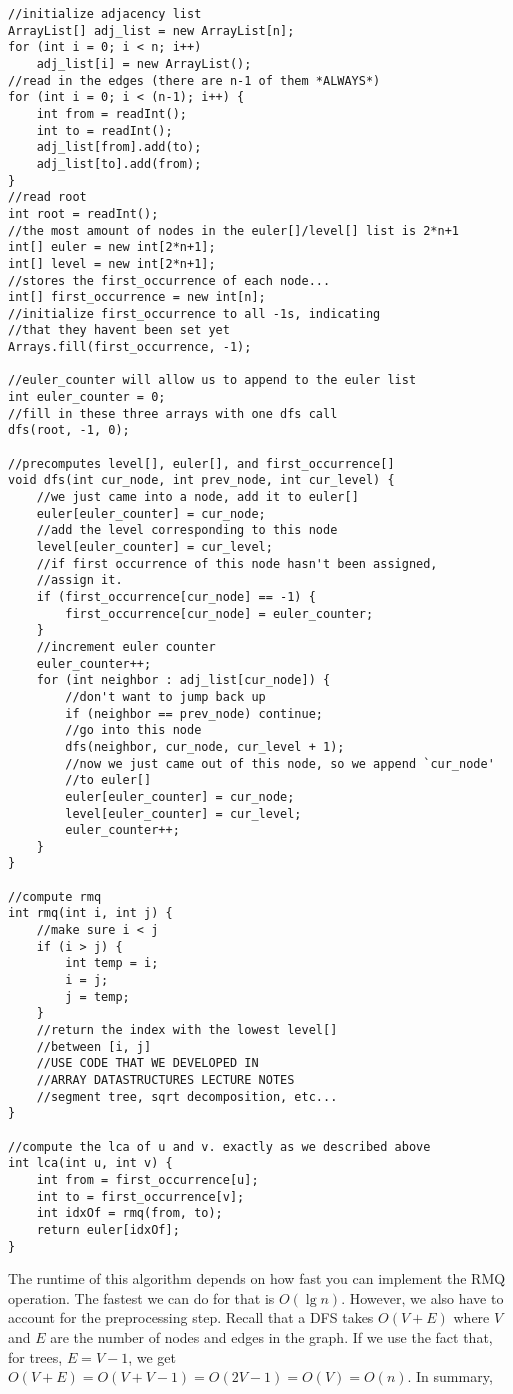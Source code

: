 \documentclass[11pt]{article}
\theoremstyle{plain}
\theoremstyle{definition}
\begin{document}
\begin{lstlisting}
//initialize adjacency list
ArrayList[] adj_list = new ArrayList[n];
for (int i = 0; i < n; i++)
	adj_list[i] = new ArrayList();
//read in the edges (there are n-1 of them *ALWAYS*)
for (int i = 0; i < (n-1); i++) {
	int from = readInt();
	int to = readInt();
	adj_list[from].add(to);
	adj_list[to].add(from);
}
//read root
int root = readInt();
//the most amount of nodes in the euler[]/level[] list is 2*n+1
int[] euler = new int[2*n+1];
int[] level = new int[2*n+1];
//stores the first_occurrence of each node...
int[] first_occurrence = new int[n];
//initialize first_occurrence to all -1s, indicating
//that they havent been set yet
Arrays.fill(first_occurrence, -1);

//euler_counter will allow us to append to the euler list
int euler_counter = 0;
//fill in these three arrays with one dfs call
dfs(root, -1, 0);

//precomputes level[], euler[], and first_occurrence[]
void dfs(int cur_node, int prev_node, int cur_level) {
	//we just came into a node, add it to euler[]
	euler[euler_counter] = cur_node;
	//add the level corresponding to this node
	level[euler_counter] = cur_level;
	//if first occurrence of this node hasn't been assigned,
	//assign it.
	if (first_occurrence[cur_node] == -1) {
		first_occurrence[cur_node] = euler_counter;
	}
	//increment euler counter
	euler_counter++;
	for (int neighbor : adj_list[cur_node]) {
		//don't want to jump back up
		if (neighbor == prev_node) continue;
		//go into this node
		dfs(neighbor, cur_node, cur_level + 1);
		//now we just came out of this node, so we append `cur_node'
		//to euler[]
		euler[euler_counter] = cur_node;
		level[euler_counter] = cur_level;
		euler_counter++;
	}
}

//compute rmq
int rmq(int i, int j) {
	//make sure i < j
	if (i > j) {
		int temp = i;
		i = j;
		j = temp;
	}
	//return the index with the lowest level[]
	//between [i, j]
	//USE CODE THAT WE DEVELOPED IN
	//ARRAY DATASTRUCTURES LECTURE NOTES
	//segment tree, sqrt decomposition, etc...
}

//compute the lca of u and v. exactly as we described above
int lca(int u, int v) {
	int from = first_occurrence[u];
	int to = first_occurrence[v];
	int idxOf = rmq(from, to);
	return euler[idxOf];
}
\end{lstlisting}
The runtime of this algorithm depends on how fast you can implement the RMQ operation. The fastest we can do for that is $O(\lg n)$. However, we also have to account for the preprocessing step. Recall that a DFS takes $O(V+E)$ where $V$ and $E$ are the number of nodes and edges in the graph. If we use the fact that, for trees, $E = V-1$, we get $O(V+E) = O(V+V-1) = O(2V - 1) = O(V) = O(n)$. In summary,
\begin{center}
\end{center}
\end{document}
